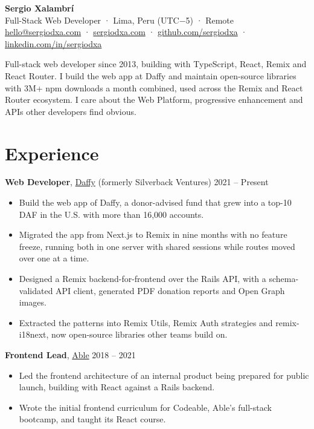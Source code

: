 \documentclass[10pt,letterpaper]{article}
\begin{document}
\begin{center}
{\LARGE\bfseries Sergio Xalambrí}\\[3pt]
Full-Stack Web Developer · Lima, Peru (UTC−5) · Remote\\[2pt]
{\small \href{mailto:hello@sergiodxa.com}{hello@sergiodxa.com} · \href{https://sergiodxa.com}{sergiodxa.com} · \href{https://github.com/sergiodxa}{github.com/sergiodxa} · \href{https://www.linkedin.com/in/sergiodxa/}{linkedin.com/in/sergiodxa}}
\end{center}

Full-stack web developer since 2013, building with TypeScript, React, Remix and React Router. I build the web app at Daffy and maintain open-source libraries with 3M+ npm downloads a month combined, used across the Remix and React Router ecosystem. I care about the Web Platform, progressive enhancement and APIs other developers find obvious.

\section*{Experience}
\textbf{Web Developer}, \href{https://www.daffy.org}{Daffy} {\color{muted}(formerly Silverback Ventures)} \hfill {\color{muted}2021 – Present}
\begin{itemize}
\item Build the web app of Daffy, a donor-advised fund that grew into a top-10 DAF in the U.S. with more than 16,000 accounts.
\item Migrated the app from Next.js to Remix in nine months with no feature freeze, running both in one server with shared sessions while routes moved over one at a time.
\item Designed a Remix backend-for-frontend over the Rails API, with a schema-validated API client, generated PDF donation reports and Open Graph images.
\item Extracted the patterns into Remix Utils, Remix Auth strategies and remix-i18next, now open-source libraries other teams build on.
\end{itemize}

\textbf{Frontend Lead}, \href{https://able.co}{Able} \hfill {\color{muted}2018 – 2021}
\begin{itemize}
\item Led the frontend architecture of an internal product being prepared for public launch, building with React against a Rails backend.
\item Wrote the initial frontend curriculum for Codeable, Able’s full-stack bootcamp, and taught its React course.
\end{itemize}
\end{document}
